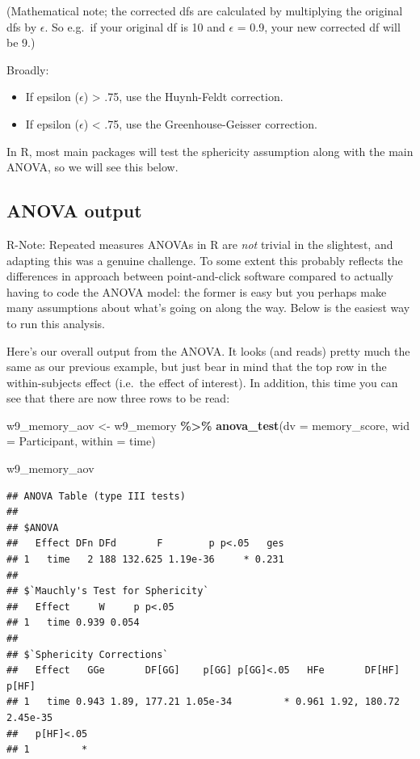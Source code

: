 \documentclass[
]{book}
\newenvironment{Shaded}{\begin{snugshade}}{\end{snugshade}}
\newcommand{\AttributeTok}[1]{\textcolor[rgb]{0.13,0.29,0.53}{#1}}
\newcommand{\FunctionTok}[1]{\textcolor[rgb]{0.13,0.29,0.53}{\textbf{#1}}}
\newcommand{\NormalTok}[1]{#1}
\newcommand{\OtherTok}[1]{\textcolor[rgb]{0.56,0.35,0.01}{#1}}
\newcommand{\SpecialCharTok}[1]{\textcolor[rgb]{0.81,0.36,0.00}{\textbf{#1}}}
\providecommand{\tightlist}{%
  \setlength{\itemsep}{0pt}\setlength{\parskip}{0pt}}
\begin{document}
(Mathematical note; the corrected dfs are calculated by multiplying the original dfs by \(\epsilon\). So e.g.~if your original df is 10 and \(\epsilon\) = 0.9, your new corrected df will be 9.)

Broadly:

\begin{itemize}
\tightlist
\item
  If epsilon (\(\epsilon\)) \textgreater{} .75, use the Huynh-Feldt correction.
\item
  If epsilon (\(\epsilon\)) \textless{} .75, use the Greenhouse-Geisser
  correction.
\end{itemize}

In R, most main packages will test the sphericity assumption along with the main ANOVA, so we will see this below.

\subsection{ANOVA output}\label{anova-output}

R-Note: Repeated measures ANOVAs in R are \emph{not} trivial in the slightest, and adapting this was a genuine challenge. To some extent this probably reflects the differences in approach between
point-and-click software compared to actually having to code the ANOVA model: the former is easy but you perhaps make many assumptions about what's going on along the way. Below is the easiest way to run this analysis.

Here's our overall output from the ANOVA. It looks (and reads) pretty much the same as our previous example, but just bear in mind that the top row in the within-subjects effect (i.e.~the effect of interest). In addition, this time you can see that there are now three rows to be
read:

\begin{Shaded}
\begin{Highlighting}[]
\NormalTok{w9\_memory\_aov }\OtherTok{\textless{}{-}}\NormalTok{ w9\_memory }\SpecialCharTok{\%\textgreater{}\%}
  \FunctionTok{anova\_test}\NormalTok{(}\AttributeTok{dv =}\NormalTok{ memory\_score, }\AttributeTok{wid =}\NormalTok{ Participant, }\AttributeTok{within =}\NormalTok{ time) }

\NormalTok{w9\_memory\_aov}
\end{Highlighting}
\end{Shaded}

\begin{verbatim}
## ANOVA Table (type III tests)
## 
## $ANOVA
##   Effect DFn DFd       F        p p<.05   ges
## 1   time   2 188 132.625 1.19e-36     * 0.231
## 
## $`Mauchly's Test for Sphericity`
##   Effect     W     p p<.05
## 1   time 0.939 0.054      
## 
## $`Sphericity Corrections`
##   Effect   GGe       DF[GG]    p[GG] p[GG]<.05   HFe       DF[HF]    p[HF]
## 1   time 0.943 1.89, 177.21 1.05e-34         * 0.961 1.92, 180.72 2.45e-35
##   p[HF]<.05
## 1         *
\end{verbatim}
\end{document}
